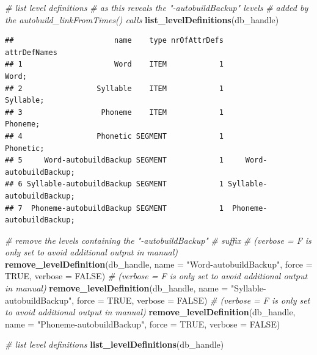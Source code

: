 \documentclass[]{book}
\newenvironment{Shaded}{\begin{snugshade}}{\end{snugshade}}
\newcommand{\CommentTok}[1]{\textcolor[rgb]{0.56,0.35,0.01}{\textit{#1}}}
\newcommand{\DataTypeTok}[1]{\textcolor[rgb]{0.13,0.29,0.53}{#1}}
\newcommand{\KeywordTok}[1]{\textcolor[rgb]{0.13,0.29,0.53}{\textbf{#1}}}
\newcommand{\NormalTok}[1]{#1}
\newcommand{\OtherTok}[1]{\textcolor[rgb]{0.56,0.35,0.01}{#1}}
\newcommand{\StringTok}[1]{\textcolor[rgb]{0.31,0.60,0.02}{#1}}
\begin{document}
\begin{Shaded}
\begin{Highlighting}[]
\CommentTok{# list level definitions}
\CommentTok{# as this reveals the "-autobuildBackup" levels}
\CommentTok{# added by the autobuild_linkFromTimes() calls}
\KeywordTok{list_levelDefinitions}\NormalTok{(db_handle)}
\end{Highlighting}
\end{Shaded}

\begin{verbatim}
##                       name    type nrOfAttrDefs              attrDefNames
## 1                     Word    ITEM            1                     Word;
## 2                 Syllable    ITEM            1                 Syllable;
## 3                  Phoneme    ITEM            1                  Phoneme;
## 4                 Phonetic SEGMENT            1                 Phonetic;
## 5     Word-autobuildBackup SEGMENT            1     Word-autobuildBackup;
## 6 Syllable-autobuildBackup SEGMENT            1 Syllable-autobuildBackup;
## 7  Phoneme-autobuildBackup SEGMENT            1  Phoneme-autobuildBackup;
\end{verbatim}

\begin{Shaded}
\begin{Highlighting}[]
\CommentTok{# remove the levels containing the "-autobuildBackup"}
\CommentTok{# suffix}
\CommentTok{# (verbose = F is only set to avoid additional output in manual)}
\KeywordTok{remove_levelDefinition}\NormalTok{(db_handle,}
                       \DataTypeTok{name =} \StringTok{"Word-autobuildBackup"}\NormalTok{,}
                       \DataTypeTok{force =} \OtherTok{TRUE}\NormalTok{,}
                       \DataTypeTok{verbose =} \OtherTok{FALSE}\NormalTok{)}
\CommentTok{# (verbose = F is only set to avoid additional output in manual)}
\KeywordTok{remove_levelDefinition}\NormalTok{(db_handle,}
                       \DataTypeTok{name =} \StringTok{"Syllable-autobuildBackup"}\NormalTok{,}
                       \DataTypeTok{force =} \OtherTok{TRUE}\NormalTok{,}
                       \DataTypeTok{verbose =} \OtherTok{FALSE}\NormalTok{)}
\CommentTok{# (verbose = F is only set to avoid additional output in manual)}
\KeywordTok{remove_levelDefinition}\NormalTok{(db_handle,}
                       \DataTypeTok{name =} \StringTok{"Phoneme-autobuildBackup"}\NormalTok{,}
                       \DataTypeTok{force =} \OtherTok{TRUE}\NormalTok{,}
                       \DataTypeTok{verbose =} \OtherTok{FALSE}\NormalTok{)}

\CommentTok{# list level definitions}
\KeywordTok{list_levelDefinitions}\NormalTok{(db_handle)}
\end{Highlighting}
\end{Shaded}
\end{document}
